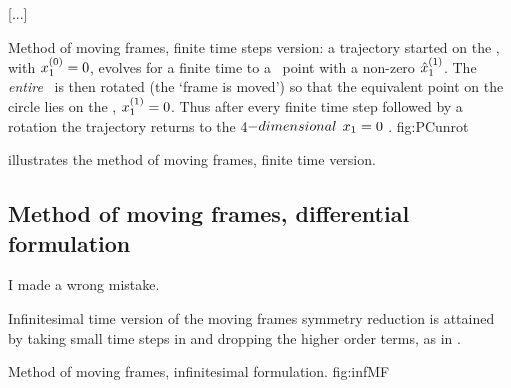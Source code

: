 {[...]

{}{
Method of moving frames, finite time steps version: a
trajectory started on the \slice, with $x_1^{(0)}
=0$, evolves for a finite time to a \statesp\ point with a
non-zero $\hat{x}_1^{(1)}$. The {\em entire} \statesp\ is then
rotated (the `frame is moved') so that the equivalent point
on the circle lies on the \slice, $x_1^{(1)} =0$.
Thus after every finite time step followed by a rotation the
trajectory returns to the 4$-dimensional$ $x_1 =0$
\reducedsp.
}
{fig:PCunrot}

 illustrates the method of moving frames,
finite time version.

\subsection{Method of moving frames, differential formulation}
\label{sect:MovFrameODE}


\begin{bartlett}
I made a wrong mistake.
\end{bartlett}


Infinitesimal time version of the moving frames symmetry
reduction is attained by taking small time steps in
 and dropping the higher order terms, as
in .

{}{
Method of moving frames, infinitesimal formulation.
}
{fig:infMF}



}
